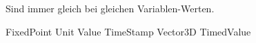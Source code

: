 





Sind immer gleich bei gleichen Variablen-Werten.

FixedPoint
Unit
Value
TimeStamp
Vector3D
TimedValue